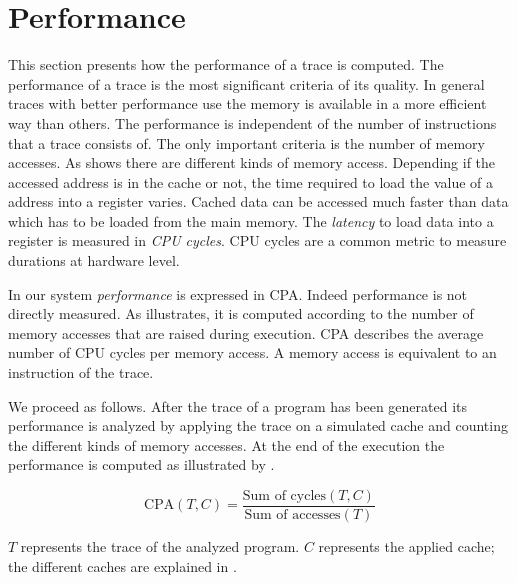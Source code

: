 \documentclass[onecolumn, openright, master, english, signatures]{dbrgrptt}
\begin{document}

\section{Performance}\label{sec:performance}

This section presents how the performance of a trace is computed.
The performance of a trace is the most significant criteria of its quality.
In general \ac{trace}s with better performance use the memory is available in a more efficient way than others.
The performance is independent of the number of instructions that a \ac{trace} consists of.
The only important criteria is the number of memory accesses.
As  shows there are different kinds of memory access.
Depending if the accessed address is in the cache or not, the time required to load the value of a address into a register varies.
Cached data can be accessed much faster than data which has to be loaded from the main memory.
The \emph{latency} to load data into a register is measured in \emph{\ac{CPU} cycles}.
\ac{CPU} cycles are a common metric to measure durations at hardware level.

In our system \emph{performance} is expressed in \ac{CPA}.
Indeed performance is not directly measured.
As  illustrates, it is computed according to the number of memory accesses that are raised during execution.
\ac{CPA} describes the average number of \ac{CPU} cycles per memory access.
A memory access is equivalent to an instruction of the trace.

We proceed as follows. After the \ac{trace} of a program has been generated its performance is analyzed by applying the trace on a simulated cache and counting the different kinds of memory accesses.
At the end of the execution the performance is computed as illustrated by .

\begin{equation}\label{equ:performance-cpa}
\text{CPA}(T,C) = \frac{\text{Sum of cycles}(T, C)}{\text{Sum of accesses}(T)}
\end{equation}

$T$ represents the \ac{trace} of the analyzed program.
$C$ represents the applied cache; the different caches are explained in .
\end{document}
